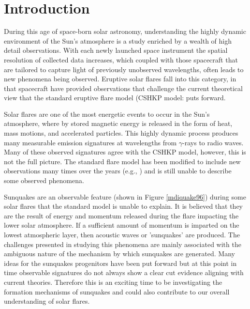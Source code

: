 \section{Introduction}
\setcounter{page}{1}

During this age of space-born solar astronomy, understanding the highly dynamic environment of the Sun's atmosphere is a study enriched by a wealth of high detail observations. With each newly launched space instrument the spatial resolution of collected data increases, which coupled with those spacecraft that are tailored to capture light of previously unobserved wavelengths, often leads to new phenomena being observed. Eruptive solar flares fall into this category, in that spacecraft have provided observations that challenge the current theoretical view that the standard eruptive flare model (CSHKP model: \citep{1964NASSP..50..451C, 1966Natur.211..695S, 1974SoPh...34..323H, 1976SoPh...50...85K} puts forward.

Solar flares are one of the most energetic events to occur in the Sun's atmosphere, where by stored magnetic energy is released in the form of heat, mass motions, and accelerated particles. This highly dynamic process produces many measurable emission signatures at wavelengths from $\gamma$-rays to radio waves. Many of these observed signatures agree with the CSHKP model, however, this is not the full picture. The standard flare model has been modified to include new observations many times over the years (e.g., \cite{2011LRSP....8....6S}) and is still unable to describe some observed phenomena. 

Sunquakes are an observable feature (shown in Figure \ref{mdiquake96}) during some solar flares that the standard model is unable to explain. It is believed that they are the result of energy and momentum released during the flare impacting the lower solar atmosphere. If a sufficient amount of momentum is imparted on the lowest atmospheric layer, then acoustic waves or 'sunquakes' are produced. The challenges presented in studying this phenomena are mainly associated with the ambiguous nature of the mechanism by which sunquakes are generated. Many ideas for the sunquakes progenitors have been put forward but at this point in time observable signatures do not always show a clear cut evidence aligning with current theories. Therefore this is an exciting time to be investigating the formation mechanisms of sunquakes and could also contribute to our overall understanding of solar flares. 

